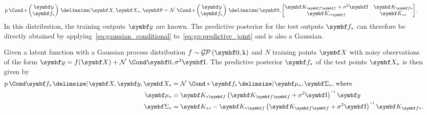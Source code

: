 \begin{align}
    \label{eq:gp:predictive_joint}
    \Prob*{\begin{pmatrix}
            \mat{y} \\
            \mat{f}_\ast
        \end{pmatrix} \given \mat{X}, \mat{X}_\ast, \mat{\theta}} & = \Gaussian*{\begin{pmatrix}
            \mat{y} \\
            \mat{f}_\ast
        \end{pmatrix} \given \mat{0}, \begin{bmatrix}
            \mat{K}_{\mat{f}\mat{f}} + \sigma^2 \Eye & \mat{K}_{\mat{f}\ast} \\
            \mat{K}_{\ast\mat{f}}                    & \mat{K}_{\ast\ast}
        \end{bmatrix}}.
\end{align}
In this distribution, the training outputs $\mat{y}$ are known.
The predictive posterior for the test outputs $\mat{f}_\ast$ can therefore be directly obtained by applying~\cref{eq:gaussian_conditional} to~\cref{eq:gp:predictive_joint} and is also a Gaussian.
\begin{lemma}
    \label{lem:gp:gp_posterior}
    Given a latent function with a Gaussian process distribution $f \sim \GP(\mat{0}, \K)$ and $N$ training points $\mat{X}$ with noisy observations of the form $\mat{y} = f(\mat{X}) + \Gaussian{\mat{0}, \sigma^2 \Eye}$.
    The predictive posterior $\mat{f}_\ast$ of the test points $\mat{X}_\ast$ is then given by
    \begin{align}
        \begin{split}
            \Prob{\mat{f}_\ast \given \mat{X}, \mat{y}, \mat{X}_\ast}
            &= \Gaussian*{\mat{f}_\ast \given \mat{\mu}_\ast, \mat{\Sigma}_\ast} \text{, where} \\
            \mat{\mu}_\ast
            &= \mat{K}_{\ast \mat{f}} \left( \mat{K}_{\mat{f}\mat{f}} + \sigma^2 \Eye \right)\inv \mat{y} \\
            \mat{\Sigma}_\ast
            &= \mat{K}_{\ast\ast} - \mat{K}_{\ast \mat{f}} \left( \mat{K}_{\mat{f}\mat{f}} + \sigma^2 \Eye \right)\inv \mat{K}_{\mat{f}\ast}.
        \end{split}
    \end{align}
\end{lemma}

